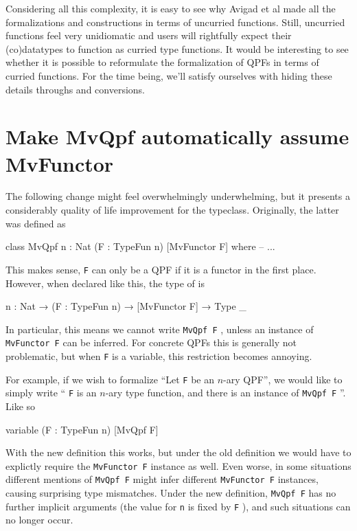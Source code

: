 \documentclass[titlepage]{report}
\newcommand\lean[1]{{%
\def\leanmode{1}%
\small \texttt{#1}%
\undef\leanmode%
}}
\begin{document}
Considering all this complexity, it is easy to see why Avigad et al made all the formalizations and
constructions in terms of uncurried functions. 
Still, uncurried functions feel very unidiomatic and users will rightfully expect their (co)datatypes
to function as curried type functions. 
It would be interesting to see whether it is possible to reformulate the formalization of QPFs in
terms of curried functions. 
For the time being, we'll satisfy ourselves with hiding these details throughs
 and  conversions.



\section{Make MvQpf automatically assume MvFunctor}
The following change might feel overwhelmingly underwhelming, but it presents a considerably quality 
of life improvement for the  typeclass. Originally, the latter was defined as
\begin{leancode}
    class MvQpf {n : Nat} (F : TypeFun n) [MvFunctor F] where
        -- ...
\end{leancode}
This makes sense, \lean{F} can only be a QPF if it is a functor in the first place.
However, when declared like this, the type of  is 

\begin{leancode}
    {n : Nat} → (F : TypeFun n) → [MvFunctor F] → Type _
\end{leancode}
In particular, this means we cannot write \lean{MvQpf F}, unless an instance of \lean{MvFunctor F} can be inferred. For concrete QPFs this is generally not problematic, but when \lean{F} is a variable, this restriction becomes annoying. 

For example, if we wish to formalize ``Let \lean{F} be an $n$-ary QPF'', we would like to simply write ``\lean{F} is an $n$-ary type function, and there is an instance of \lean{MvQpf F}''. Like so
\begin{leancode}
    variable (F : TypeFun n) [MvQpf F]
\end{leancode}

With the new definition this works, but under the old definition we would have to explictly require the \lean{MvFunctor F} instance as well. 
Even worse, in some situations different mentions of \lean{MvQpf F} might infer different \lean{MvFunctor F} instances, causing surprising type mismatches. Under the new definition, \lean{MvQpf F} has no further implicit arguments (the value for \lean{n} is fixed by \lean{F}), and such situations can no longer occur.
\end{document}
